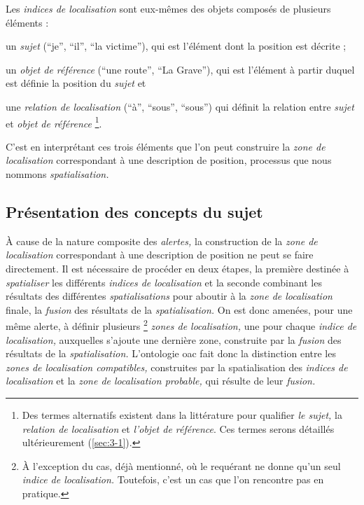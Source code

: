 Les \emph{indices de localisation} sont eux-mêmes des objets composés
de plusieurs éléments :
%
\begin{enumerate*}[label=(\alph*)]
\item un \emph{sujet} (\eg \enquote{je}, \enquote{il}, \enquote{la
    victime}), qui est l'élément dont la position est décrite ;
\item un \emph{objet de référence} (\eg \enquote{une route},
  \enquote{La Grave}), qui est l'élément à partir duquel est définie
  la position du \emph{sujet} et
\item une \emph{relation de localisation} (\eg \enquote{à},
  \enquote{sous}, \enquote{sous}) qui définit la relation entre
  \emph{sujet} et \emph{objet de référence} \footnote{Des termes
    alternatifs existent dans la littérature pour qualifier \emph{le
      sujet,} la \emph{relation de localisation} et \emph{l'objet de
      référence}. Ces termes serons détaillés ultérieurement
    (\ref{sec:3-1}).}.
\end{enumerate*}
%
C'est en interprétant ces trois éléments que l'on peut construire la
\emph{zone de localisation} correspondant à une description de
position, processus que nous nommons \emph{spatialisation.}

\subsection{Présentation des concepts du sujet}
\label{subsec:2-2}



À cause de la nature composite des \emph{alertes,} la construction de
la \emph{zone de localisation} correspondant à une description de
position ne peut se faire directement. Il est nécessaire de procéder
en deux étapes, la première destinée à \emph{spatialiser} les
différents \emph{indices de localisation} et la seconde combinant les
résultats des différentes \emph{spatialisations} pour aboutir à la
\emph{zone de localisation} finale, \ie la \emph{fusion} des résultats
de la \emph{spatialisation.} On est donc amenées, pour une même
alerte, à définir plusieurs \footnote{À l'exception du cas, déjà
  mentionné, où le requérant ne donne qu'un seul \emph{indice de
    localisation.}  Toutefois, c'est un cas que l'on rencontre pas en
  pratique.}  \emph{zones de localisation,} une pour chaque
\emph{indice de localisation,} auxquelles s'ajoute une dernière zone,
construite par la \emph{fusion} des résultats de la
\emph{spatialisation.}  L'ontologie \ac{oac} \autocite{Viry2019} fait
donc la distinction entre les \emph{zones de localisation
  compatibles,} construites par la spatialisation des \emph{indices de
  localisation} et la \emph{zone de localisation probable,} qui
résulte de leur \emph{fusion.}

